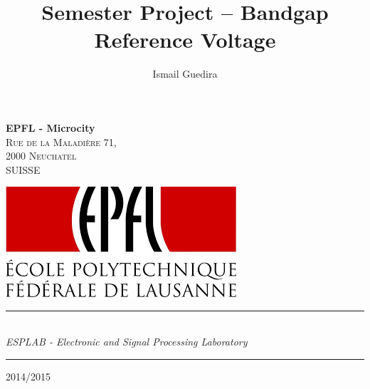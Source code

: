 \documentclass[11pt,a4paper]{report}
\title{Semester Project -- Bandgap Reference Voltage}
\author{Ismail Guedira}
\begin{document}

 \makeatletter
   \begin{titlepage}
    {
    
    
    \Large \textbf{EPFL - Microcity} \hfill \\
    \large \textsc{Rue de la Maladière 71,} \hfill \\ %
	  \large \textsc{2000 Neuchatel} \hfill \\
    \large \textsc{SUISSE} \hfill \\ }
    \begin{flushright}
      \includegraphics[height=0.1\textheight]{logo_epfl} 
    \end{flushright}
    
	\hspace{3em}
% 
% 
 \vfill
\centering

 
     \hrule
     \vspace{2em}
     \huge \textbf{\@title} \\
     \vspace{1em}
     \LARGE \textit{ESPLAB - Electronic and Signal Processing Laboratory}
     \vspace{2em}
     \hrule
    
        
    
% 
% 
% 
     \vfill
% 
      {\Large \textsc{2014/2015}  \hfill \Large \textsc{\@date}} \\
% 
% 
  \end{titlepage}
\makeatother
\end{document}
